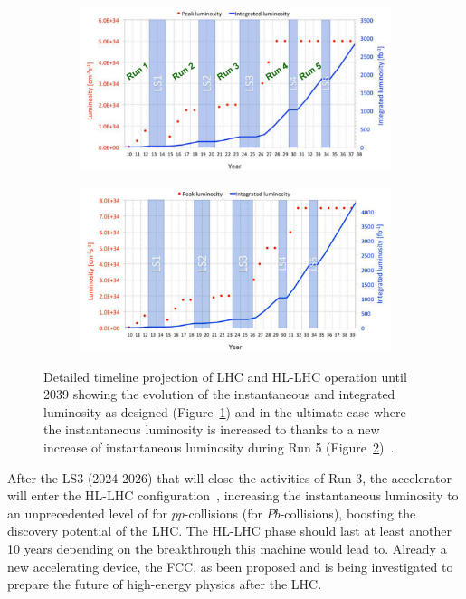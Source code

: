 	\begin{figure}[H]
		\begin{subfigure}{\linewidth}
			\centering
			\includegraphics[width=\plotwidth]{fig/chapt2/HL-LHC-nominal.png}\\
			\caption{\label{fig:HL-LHC-Timeline:A}}
		\end{subfigure}
		\begin{subfigure}{\linewidth}
			\centering
			\includegraphics[width=\plotwidth]{fig/chapt2/HL-LHC-ultimate.png}
			\caption{\label{fig:HL-LHC-Timeline:B}}
		\end{subfigure}
		\caption{\label{fig:HL-LHC-Timeline} Detailed timeline projection of LHC and HL-LHC operation until 2039 showing the evolution of the instantaneous and integrated luminosity as designed (Figure~\ref{fig:HL-LHC-Timeline:A}) and in the ultimate case where the instantaneous luminosity is increased to \siflux thanks to a new increase of instantaneous luminosity during Run 5 (Figure~\ref{fig:HL-LHC-Timeline:B})~\cite{HLLHC2017,HLLHCPDR}.}
	\end{figure}
	
	After the \acl{LS3} (2024-2026) that will close the activities of Run 3, the accelerator will enter the HL-LHC configuration~\cite{HLLHC2017}, increasing the instantaneous luminosity to an unprecedented level of \siflux for $pp$-collisions (\siflux for $Pb$-collisions), boosting the discovery potential of the LHC. The HL-LHC phase should last at least another 10 years depending on the breakthrough this machine would lead to. Already a new accelerating device, the FCC, as been proposed and is being investigated to prepare the future of high-energy physics after the LHC.
	

